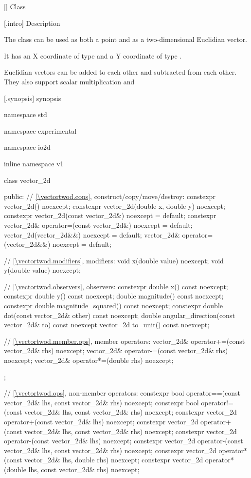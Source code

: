  [\vectortwod] {Class }

 [\vectortwod.intro] { Description}

\pnum
{}
The class  can be used as both a point and as a two-dimensional Euclidian vector.

\pnum
It has an X coordinate of type  and a Y coordinate of type .

\pnum
Euclidian vectors can be added to each other and subtracted from each other. They also support scalar multiplication and 
 

 [\vectortwod.synopsis] { synopsis}

\begin{codeblock}
namespace std { namespace experimental { namespace io2d { inline namespace v1 {
  class vector_2d {
  public:
    // \ref{\vectortwod.cons}, construct/copy/move/destroy:
    constexpr vector_2d() noexcept;
    constexpr vector_2d(double x, double y) noexcept;
    constexpr vector_2d(const vector_2d&) noexcept = default;
    constexpr vector_2d& operator=(const vector_2d&) noexcept = default;
    vector_2d(vector_2d&&) noexcept = default;
    vector_2d& operator=(vector_2d&&) noexcept = default;

    // \ref{\vectortwod.modifiers}, modifiers:
    void x(double value) noexcept;
    void y(double value) noexcept;
    
    // \ref{\vectortwod.observers}, observers:
    constexpr double x() const noexcept;
    constexpr double y() const noexcept;
    double magnitude() const noexcept;
    constexpr double magnitude_squared() const noexcept;
    constexpr double dot(const vector_2d& other) const noexcept;
    double angular_direction(const vector_2d& to) const noexcept
    vector_2d to_unit() const noexcept;
    
    // \ref{\vectortwod.member.ops}, member operators:
    vector_2d& operator+=(const vector_2d& rhs) noexcept;
    vector_2d& operator-=(const vector_2d& rhs) noexcept;
    vector_2d& operator*=(double rhs) noexcept;
  };
  
  // \ref{\vectortwod.ops}, non-member operators:
  constexpr bool operator==(const vector_2d& lhs, const vector_2d& rhs)
    noexcept;
  constexpr bool operator!=(const vector_2d& lhs, const vector_2d& rhs)
    noexcept;
  constexpr vector_2d operator+(const vector_2d& lhs) noexcept;
  constexpr vector_2d operator+(const vector_2d& lhs, const vector_2d& rhs)
    noexcept;
  constexpr vector_2d operator-(const vector_2d& lhs) noexcept;
  constexpr vector_2d operator-(const vector_2d& lhs, const vector_2d& rhs)
    noexcept;
  constexpr vector_2d operator*(const vector_2d& lhs, double rhs) noexcept;
  constexpr vector_2d operator*(double lhs, const vector_2d& rhs) noexcept;
} } } }
\end{codeblock}

